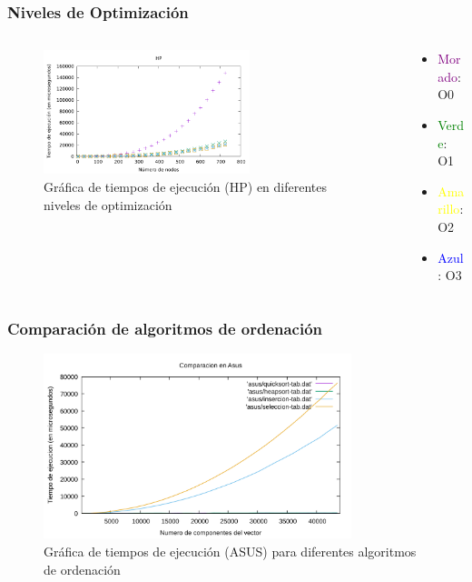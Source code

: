 \documentclass[8pt, aspectratio=169]{beamer}
\begin{document}
    \begin{frame}
        \frametitle{Niveles de Optimización}

        \begin{columns}
            \begin{column}{0.7\textwidth} 
                \begin{figure}
                    \includegraphics[width=0.65\textwidth]{../data/hp_opt.pdf}
                    \caption{Gráfica de tiempos de ejecución (HP) en diferentes niveles de optimización}
                \end{figure}
            \end{column}

            \begin{column}{0.3\textwidth}
                \begin{itemize}
                    \item \textcolor{purple}{Morado}: O0
                    \item \textcolor{green}{Verde}: O1
                    \item \textcolor{yellow}{Amarillo}: O2
                    \item \textcolor{blue}{Azul}: O3 
                \end{itemize}
            \end{column}
        \end{columns}
        
    \end{frame}

    \begin{frame}
        \frametitle{Comparación de algoritmos de ordenación}

        \begin{figure}
            \includegraphics[width=0.8\textwidth]{../data/asus-orden-todos.pdf}
            \caption{Gráfica de tiempos de ejecución (ASUS) para diferentes algoritmos de ordenación}
        \end{figure}
    \end{frame}
\end{document}
